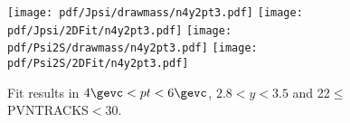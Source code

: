 \begin{figure}[H]
\begin{center}
\texttt{[image: pdf/Jpsi/drawmass/n4y2pt3.pdf]}
\texttt{[image: pdf/Jpsi/2DFit/n4y2pt3.pdf]}
\vspace*{-0.5cm}
\texttt{[image: pdf/Psi2S/drawmass/n4y2pt3.pdf]}
\texttt{[image: pdf/Psi2S/2DFit/n4y2pt3.pdf]}
\vspace*{-0.5cm}
\end{center}
\caption{Fit results in $4\gevc<pt<6\gevc$, $2.8<y<3.5$ and 22$\leq$PVNTRACKS$<$30.}
\label{Fitn4y2pt3}
\end{figure}
